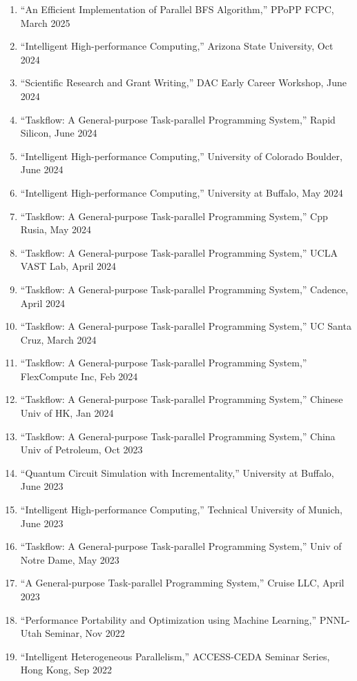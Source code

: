 \documentclass[A4,11pt]{article}
\begin{document}
 \begin{enumerate}
 \itemsep-0.3em
  \item ``An Efficient Implementation of Parallel BFS Algorithm,'' PPoPP FCPC, March 2025
  \item ``Intelligent High-performance Computing,'' Arizona State University, Oct 2024
  \item ``Scientific Research and Grant Writing,'' DAC Early Career Workshop, June 2024
  \item ``Taskflow: A General-purpose Task-parallel Programming System,'' Rapid Silicon, June 2024
  \item ``Intelligent High-performance Computing,'' University of Colorado Boulder, June 2024
  \item ``Intelligent High-performance Computing,'' University at Buffalo, May 2024
  \item ``Taskflow: A General-purpose Task-parallel Programming System,'' Cpp Rusia, May 2024
  \item ``Taskflow: A General-purpose Task-parallel Programming System,'' UCLA VAST Lab, April 2024
  \item ``Taskflow: A General-purpose Task-parallel Programming System,'' Cadence, April 2024
  \item ``Taskflow: A General-purpose Task-parallel Programming System,'' UC Santa Cruz, March 2024 
  \item ``Taskflow: A General-purpose Task-parallel Programming System,'' FlexCompute Inc, Feb 2024
  \item ``Taskflow: A General-purpose Task-parallel Programming System,'' Chinese Univ of HK, Jan 2024
  \item ``Taskflow: A General-purpose Task-parallel Programming System,'' China Univ of Petroleum, Oct 2023
  \item ``Quantum Circuit Simulation with Incrementality,'' University at Buffalo, June 2023
  \item ``Intelligent High-performance Computing,'' Technical University of Munich, June 2023
  \item ``Taskflow: A General-purpose Task-parallel Programming System,'' Univ of Notre Dame, May 2023
  \item ``A General-purpose Task-parallel Programming System,'' Cruise LLC, April 2023
  \item ``Performance Portability and Optimization using Machine Learning,'' PNNL-Utah Seminar, Nov 2022
  \item ``Intelligent Heterogeneous Parallelism,'' ACCESS-CEDA Seminar Series, Hong Kong, Sep 2022

\end{enumerate}
\end{document}
